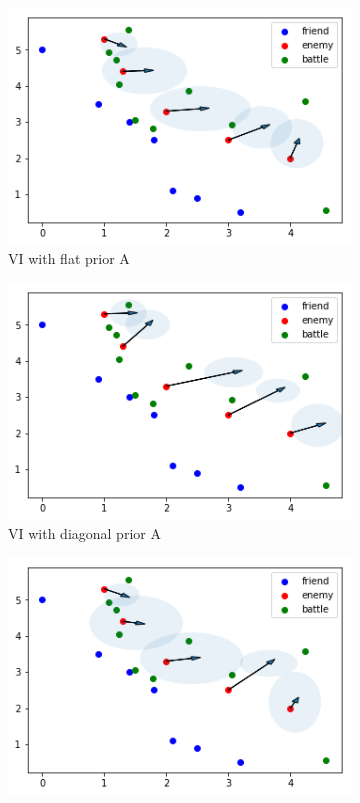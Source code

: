 \documentclass{article}
\begin{document}
\begin{figure}[h!]
  \begin{subfigure}[b]{0.45\linewidth}
    \includegraphics[width=\linewidth]{VI11.png}
    \caption{VI with flat prior A}
  \end{subfigure}
  \begin{subfigure}[b]{0.45\linewidth}
    \includegraphics[width=\linewidth]{VI12.png}
    \caption{VI with diagonal prior A}
  \end{subfigure}
  \begin{subfigure}[b]{0.45\linewidth}
    \includegraphics[width=\linewidth]{VI21.png}

\end{subfigure}
\end{figure}
\end{document}
